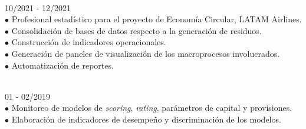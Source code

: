 \documentclass[letterpaper,10pt,spanish]{article}
\begin{document}
\begin{minipage}[t]{0.72\textwidth}
\begin{minipage}[t]{0.45\textwidth}
{ \\ 10/2021 - 12/2021}\\
$\bullet$ Profesional estadístico para el proyecto de Economía Circular, LATAM Airlines.\\
$\bullet$ Consolidación de bases de datos respecto a la generación de residuos.\\
$\bullet$ Construcción de indicadores operacionales.\\
$\bullet$ Generación de paneles de visualización de los macroprocesos involucrados.\\
$\bullet$ Automatización de reportes.\\


\vspace{0.1cm}

\end{minipage}
\hfill
\begin{minipage}[t]{0.45\textwidth}

{ \\ 01 - 02/2019}\\
$\bullet$ Monitoreo de modelos de \textit{scoring}, \textit{rating}, parámetros de capital y provisiones.\\
$\bullet$ Elaboración de indicadores de desempeño y discriminación de los modelos.\\
\
\\


\end{minipage}
\end{minipage}
\end{document}
